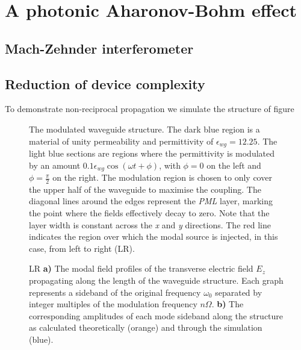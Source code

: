 \chapter{A photonic Aharonov-Bohm effect}

\section{Mach-Zehnder interferometer}

\section{Reduction of device complexity}
To demonstrate non-reciprocal propagation we simulate the structure of figure 
\begin{figure}[t]
\centering
\setlength{\figH}{1\textwidth}
\setlength{\figW}{1\textwidth}

\caption[The modulated waveguide structure]{The modulated waveguide structure. The dark blue region is a material of unity permeability and permittivity of $\epsilon_{wg} = 12.25$. The light blue sections are regions where the permittivity is modulated by an amount $0.1 \epsilon_{wg} \cos(\omega t + \phi)$, with $\phi=0$ on the left and $\phi=\frac{\pi}{2}$ on the right. The modulation region is chosen to only cover the upper half of the waveguide to maximise the coupling. The diagonal lines around the edges represent the \textit{PML} layer, marking the point where the fields effectively decay to zero. Note that the layer width is constant across the \textit{x} and \textit{y} directions. The red line indicates the region over which the modal source is injected, in this case, from left to right (LR).}
\label{fig:cavity}
\end{figure}


                    
\begin{figure}[t]
    \centering
    \setlength{\figH}{1\textwidth}
	\setlength{\figW}{1\textwidth}
	
    \caption{LR \textbf{a)} The modal field profiles of the transverse electric field $E_z$ propagating along the length of the waveguide structure. Each graph represents a sideband of the original frequency $\omega_0$ separated by integer multiples of the modulation frequency $n \Omega$. \textbf{b)} The corresponding amplitudes of each mode sideband along the structure as calculated theoretically (orange) and through the simulation (blue).}
    \label{fig:LRFang}
\end{figure}

